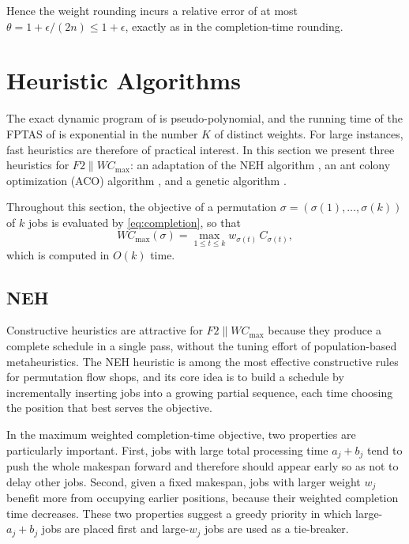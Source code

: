 \documentclass[12pt]{article}
\let\origsubsection\subsection
\renewcommand{\subsection}{\FloatBarrier\origsubsection}
\let\origsection\section
\renewcommand{\section}{\FloatBarrier\origsection}
\begin{document}
\begin{sloppypar}
Hence the weight rounding incurs
a relative error of at most $\theta=1+\epsilon/(2n)\le 1+\epsilon$, exactly as in the
completion-time rounding.







\section{Heuristic Algorithms}
\label{sec:heuristics}

The exact dynamic program of  is pseudo-polynomial, and the
running time of the FPTAS of  is exponential in the number $K$ of
distinct weights. For large instances, fast heuristics are therefore of practical interest.
In this section we present three heuristics for $F2 \parallel W C_{\max}$: an adaptation of
the NEH algorithm \citep{puka2024}, an ant colony optimization (ACO) algorithm
\citep{zhang2023}, and a genetic algorithm \citep{reeves1995}.

Throughout this section, the objective of a permutation
$\sigma=(\sigma(1),\dots,\sigma(k))$ of $k$ jobs is evaluated by \cref{eq:completion}, so that
\[
W C_{\max}(\sigma)=\max_{1\le t\le k} w_{\sigma(t)}\, C_{\sigma(t)},
\]
which is computed in $O(k)$ time.


\subsection{NEH}
Constructive heuristics are attractive for $F2 \parallel W C_{\max}$ because they produce a
complete schedule in a single pass, without the tuning effort of population-based
metaheuristics. The NEH heuristic \citep{puka2024} is among the most effective
constructive rules for permutation flow shops, and its core idea is to build a schedule by
incrementally inserting jobs into a growing partial sequence, each time choosing the
position that best serves the objective.

In the maximum weighted completion-time objective, two properties are particularly
important. First, jobs with large total processing time $a_j+b_j$ tend to push the whole
makespan forward and therefore should appear early so as not to delay other jobs. Second,
given a fixed makespan, jobs with larger weight $w_j$ benefit more from occupying earlier
positions, because their weighted completion time decreases. These two properties suggest a
greedy priority in which large-$a_j+b_j$ jobs are placed first and large-$w_j$ jobs are used
as a tie-breaker.


\end{sloppypar}
\end{document}
